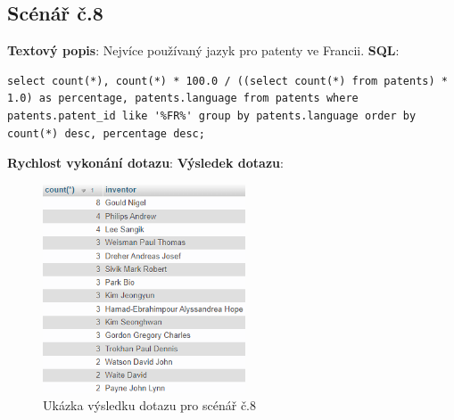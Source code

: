 \subsection{Scénář č.8}
\textbf{Textový popis}: Nejvíce používaný jazyk pro patenty ve Francii.
\newline
\textbf{SQL}: 
\begin{lstlisting}[label = {lst:elements_a}]
select count(*), count(*) * 100.0 / ((select count(*) from patents) * 1.0) as percentage, patents.language from patents where patents.patent_id like '%FR%' group by patents.language order by count(*) desc, percentage desc;
\end{lstlisting}
\textbf{Rychlost vykonání dotazu}: 
\newline
\textbf{Výsledek dotazu}:
\begin{figure}[H]
\centering
\includegraphics[width=6cm]{img/scenare/scenar_9}
\caption{Ukázka výsledku dotazu pro scénář č.8}
\label{fig:scenar8}
\end{figure}

